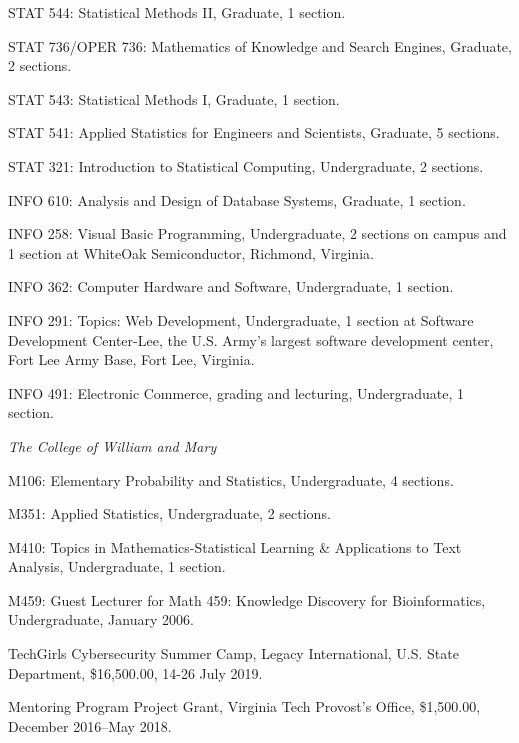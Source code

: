\documentclass[11pt,article,oneside]{memoir}
\begin{document}
\ind STAT 544: Statistical Methods II, Graduate, 1 section.

\ind STAT 736/OPER 736: Mathematics of Knowledge and Search Engines, Graduate, 2 sections.

\ind STAT 543: Statistical Methods I, Graduate, 1 section.

\ind STAT 541: Applied Statistics for Engineers and Scientists, Graduate, 5 sections.

\ind STAT 321: Introduction to Statistical Computing, Undergraduate, 2 sections.

\ind INFO 610: Analysis and Design of Database Systems, Graduate, 1 section.

\ind INFO 258: Visual Basic Programming, Undergraduate, 2 sections on campus and 1 section at WhiteOak Semiconductor, Richmond, Virginia.

\ind INFO 362: Computer Hardware and Software, Undergraduate, 1 section.

\ind INFO 291: Topics: Web Development, Undergraduate, 1 section at Software Development Center-Lee, the U.S. Army’s largest software development center, Fort Lee Army Base, Fort Lee, Virginia.

\ind INFO 491: Electronic Commerce, grading and lecturing, Undergraduate, 1 section. 



\bigskip

\noindent\emph{The College of William and Mary \vspace{0.05in}}

\ind M106: Elementary Probability and Statistics, Undergraduate, 4 sections.

\ind M351: Applied Statistics, Undergraduate, 2 sections.

\ind M410: Topics in Mathematics-Statistical Learning \& Applications to Text Analysis, Undergraduate, 1 section.

\ind M459: Guest Lecturer for Math 459: Knowledge Discovery for Bioinformatics, Undergraduate, January 2006.

\bigskip


\ind TechGirls Cybersecurity Summer Camp, Legacy International, U.S. State Department, \$16,500.00, 14-26 July 2019.

\ind Mentoring Program Project Grant, Virginia Tech Provost's Office, \$1,500.00, December 2016--May 2018.
\end{document}
